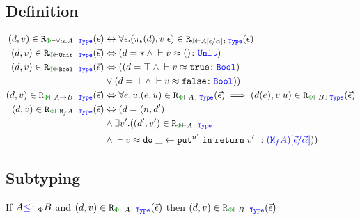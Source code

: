 \documentclass{Report}
\begin{document}
\subsection{Definition}
\begin{definition}

    \begin{align*}
        \label{LogicalRelationDefinition}
        (d, v)\in\erelates{\P}{\all{\a}{A}}(\ev) & \leftrightarrow \forall\e. (\pe(d), \eapp{v}{\e})\in\erelates{\P}{A\ssub{\a}{\e}}(\ev)\\
        (d, v)\in\erelates{\P}{\U}(\ev) & \Leftrightarrow (d=\singleton \wedge \zberelation{v}{()}{\U})
        \\
        (d, v)\in\erelates{\P}{\B}(\ev) & \Leftrightarrow ((d=\top \wedge \zberelation{v}{\t}{\B}) 
        \\& \vee (d=\bot \wedge \zberelation{v}{\f}{\B}))
        \\
        (d, v)\in\erelates{\P}{\ab}(\ev)  &\Leftrightarrow \forall e, u. (e, u)\in\erelates{\P}{A}(\ev) \implies (d(e), \apply{v}{u})\in \erelates{\P}{B}(\ev)
        \\
        (d, v)\in\erelates{\P}{\M{f}{A}}(\ev) &\Leftrightarrow (d= (n, d')
        \\ & \wedge \exists v'. ((d', v')\in\erelates{\P}{A}
        \\ & \wedge  \zberelation{v}{\doin{\_}{\put^{n'}}{\return{v'}}}{(\M{f}{A})\ssub{\av}{\ev}}))
    \end{align*}
\end{definition}
\subsection{Subtyping}

\begin{theorem}\label{LogRelSubtype}
    If $A{\color{blue} \leq\colon}_\Phi B$ and $\inLogRelPE{d}{v}{A}$ then $\inLogRelPE{d}{v}{B}$
\end{theorem}
\end{document}
